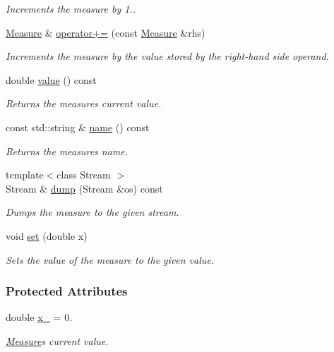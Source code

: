 \begin{DoxyCompactItemize}
\begin{DoxyCompactList}\small\item\em Increments the measure by 1.. \end{DoxyCompactList}\item 
\hyperlink{structMeasure}{Measure} \& \hyperlink{structMeasure_a0aab884d52ee53dd897c122aa185a4d9}{operator+=} (const \hyperlink{structMeasure}{Measure} \&rhs)
\begin{DoxyCompactList}\small\item\em Increments the measure by the value stored by the right-\/hand side operand. \end{DoxyCompactList}\item 
double \hyperlink{structMeasure_ae30c0892e37a007d90ae5bbe54444267}{value} () const 
\begin{DoxyCompactList}\small\item\em Returns the measure\textquotesingle{}s current value. \end{DoxyCompactList}\item 
const std\+::string \& \hyperlink{structMeasure_a3740ab23d87ed974def1cc92e6d38ac3}{name} () const 
\begin{DoxyCompactList}\small\item\em Returns the measure\textquotesingle{}s name. \end{DoxyCompactList}\item 
{\footnotesize template$<$class Stream $>$ }\\Stream \& \hyperlink{structMeasure_a89384053fc7c0e81d7cc482983cb851f}{dump} (Stream \&os) const 
\begin{DoxyCompactList}\small\item\em Dumps the measure to the given stream. \end{DoxyCompactList}\item 
void \hyperlink{structMeasure_aba62c8a81ebd05a5cae1a65beb08218e}{set} (double x)
\begin{DoxyCompactList}\small\item\em Sets the value of the measure to the given value. \end{DoxyCompactList}\end{DoxyCompactItemize}
\subsubsection*{Protected Attributes}
\begin{DoxyCompactItemize}
\item 
double \hyperlink{structMeasure_a6095870c9cb6ad8ff492490b02ee130e}{x\+\_\+} = 0.\hypertarget{structMeasure_a6095870c9cb6ad8ff492490b02ee130e}{}\label{structMeasure_a6095870c9cb6ad8ff492490b02ee130e}

\begin{DoxyCompactList}\small\item\em \hyperlink{structMeasure}{Measure}\textquotesingle{}s current value. \end{DoxyCompactList}\end{DoxyCompactItemize}
